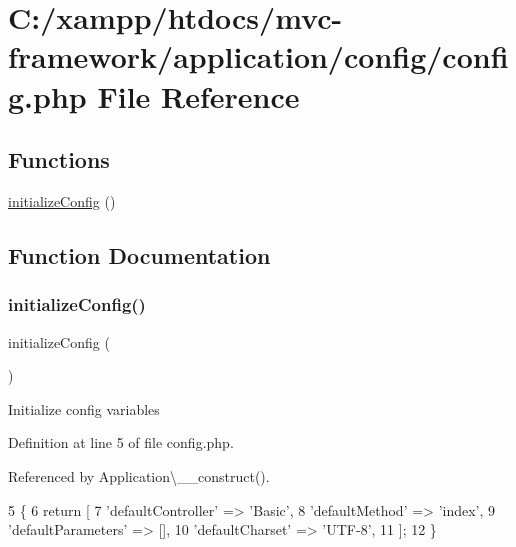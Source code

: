 \hypertarget{config_8php}{}\section{C\+:/xampp/htdocs/mvc-\/framework/application/config/config.php File Reference}
\label{config_8php}
\subsection*{Functions}
\begin{DoxyCompactItemize}
\item 
\hyperlink{config_8php_afeb1d281d402615776fdb0320a5b8d05}{initialize\+Config} ()
\end{DoxyCompactItemize}


\subsection{Function Documentation}
\hypertarget{config_8php_afeb1d281d402615776fdb0320a5b8d05}{}\label{config_8php_afeb1d281d402615776fdb0320a5b8d05} 
\subsubsection{\texorpdfstring{initialize\+Config()}{initializeConfig()}}
{\footnotesize\ttfamily initialize\+Config (\begin{DoxyParamCaption}{ }\end{DoxyParamCaption})}

Initialize config variables 

Definition at line 5 of file config.\+php.



Referenced by Application\textbackslash{}\+\_\+\+\_\+construct().


\begin{DoxyCode}
5                             \{
6     \textcolor{keywordflow}{return} [
7         \textcolor{stringliteral}{'defaultController'} => \textcolor{stringliteral}{'Basic'},
8         \textcolor{stringliteral}{'defaultMethod'} => \textcolor{stringliteral}{'index'},
9         \textcolor{stringliteral}{'defaultParameters'} => [],
10         \textcolor{stringliteral}{'defaultCharset'} => \textcolor{stringliteral}{'UTF-8'},
11     ];
12 \}
\end{DoxyCode}
